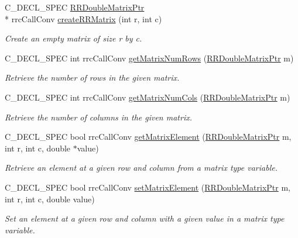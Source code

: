 \begin{DoxyCompactItemize}
C\-\_\-\-D\-E\-C\-L\-\_\-\-S\-P\-E\-C \hyperlink{rrc__types_8h_ae586a879d30f0823087e42d93464b5dd}{R\-R\-Double\-Matrix\-Ptr} \\*
rrc\-Call\-Conv \hyperlink{group__helper_routines_gabf1979f15bd6b02315b3f9d880fded85}{create\-R\-R\-Matrix} (int r, int c)
\begin{DoxyCompactList}\small\item\em Create an empty matrix of size r by c. \end{DoxyCompactList}\item 
C\-\_\-\-D\-E\-C\-L\-\_\-\-S\-P\-E\-C int rrc\-Call\-Conv \hyperlink{group__helper_routines_ga13d0d619adf01ca451033e742aaed38e}{get\-Matrix\-Num\-Rows} (\hyperlink{rrc__types_8h_ae586a879d30f0823087e42d93464b5dd}{R\-R\-Double\-Matrix\-Ptr} m)
\begin{DoxyCompactList}\small\item\em Retrieve the number of rows in the given matrix. \end{DoxyCompactList}\item 
C\-\_\-\-D\-E\-C\-L\-\_\-\-S\-P\-E\-C int rrc\-Call\-Conv \hyperlink{group__helper_routines_ga643d224921897abead4fdcdf1e1e362e}{get\-Matrix\-Num\-Cols} (\hyperlink{rrc__types_8h_ae586a879d30f0823087e42d93464b5dd}{R\-R\-Double\-Matrix\-Ptr} m)
\begin{DoxyCompactList}\small\item\em Retrieve the number of columns in the given matrix. \end{DoxyCompactList}\item 
C\-\_\-\-D\-E\-C\-L\-\_\-\-S\-P\-E\-C bool rrc\-Call\-Conv \hyperlink{group__helper_routines_gaa33df22ddaa04d8703c1535904080886}{get\-Matrix\-Element} (\hyperlink{rrc__types_8h_ae586a879d30f0823087e42d93464b5dd}{R\-R\-Double\-Matrix\-Ptr} m, int r, int c, double $\ast$value)
\begin{DoxyCompactList}\small\item\em Retrieve an element at a given row and column from a matrix type variable. \end{DoxyCompactList}\item 
C\-\_\-\-D\-E\-C\-L\-\_\-\-S\-P\-E\-C bool rrc\-Call\-Conv \hyperlink{group__helper_routines_ga6006f42f161e87a1b1a98fbcc42bea20}{set\-Matrix\-Element} (\hyperlink{rrc__types_8h_ae586a879d30f0823087e42d93464b5dd}{R\-R\-Double\-Matrix\-Ptr} m, int r, int c, double value)
\begin{DoxyCompactList}\small\item\em Set an element at a given row and column with a given value in a matrix type variable. \end{DoxyCompactList}\item 

\end{DoxyCompactItemize}
